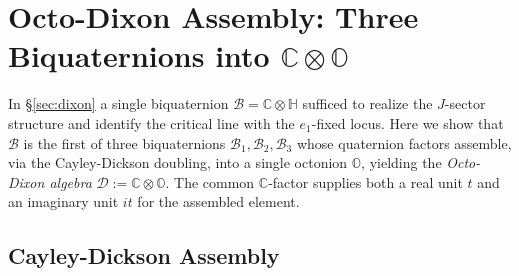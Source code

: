 \documentclass[12pt,a4paper]{article}
\theoremstyle{remark}
\begin{document}

\section{Octo-Dixon Assembly: Three Biquaternions into $\mathbb{C}\otimes\mathbb{O}$}
\label{sec:octo_dixon}

In \S\ref{sec:dixon} a single biquaternion $\mathcal{B}=\mathbb{C}\otimes\mathbb{H}$
sufficed to realize the $J$-sector structure and identify the critical line
with the $e_1$-fixed locus.
Here we show that $\mathcal{B}$ is the first of three biquaternions
$\mathcal{B}_1,\mathcal{B}_2,\mathcal{B}_3$ whose quaternion factors assemble,
via the Cayley-Dickson doubling, into a single octonion $\mathbb{O}$,
yielding the \emph{Octo-Dixon algebra}
$\mathcal{D}:=\mathbb{C}\otimes\mathbb{O}$.
The common $\mathbb{C}$-factor supplies both a real unit $t$ and an imaginary
unit $it$ for the assembled element.

\subsection*{Cayley-Dickson Assembly}
\end{document}

